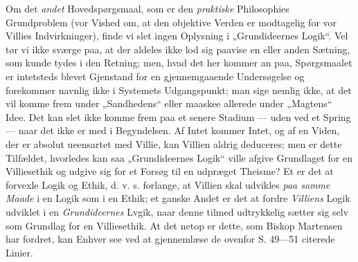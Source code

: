 \documentclass[12pt,a4paper]{book}
\newcommand{\opage}[1]{\marginnote{\footnotesize\textit{[#1]}}}
\begin{document}
Om det \emph{andet} Hovedspørgsmaal, som er den
\emph{praktiske} Philosophies Grundproblem (vor Vished om,
at den objektive Verden er modtagelig for vor Villies
Indvirkninger), finde vi slet ingen Oplysning i „Grundideernes
Logik“. Vel tør vi ikke sværge paa, at der
aldeles ikke lod sig paavise en eller anden Sætning, som
kunde tydes i den Retning; men, hvad det her kommer
an paa, Spørgsmaalet er intetsteds blevet Gjenstand for
en gjennemgaaende Undersøgelse og forekommer navnlig
ikke i Systemets Udgangspunkt; man sige nemlig ikke,
at det vil komme frem under „Sandhedens“ eller maaskee
allerede under „Magtens“ Idee. Det kan slet ikke
komme frem paa et senere Stadium --- uden ved et
Spring --- naar det ikke er med i Begyndelsen. Af
Intet kommer Intet, og af en Viden, der er absolut
ueensartet med Villie, kan Villien aldrig deduceres; men
er dette Tilfældet, hvorledes kan saa „Grundideernes
Logik“ ville afgive Grundlaget for en Villiesethik og
udgive sig for et Forsøg til en udpræget Theisme? Et
er det at forvexle Logik og Ethik, d. v. s. forlange, at
Villien skal udvikles \emph{paa samme Maade} i en Logik
som i en Ethik; et ganske Andet er det at fordre \emph{Villiens}
Logik udviklet i en \emph{Grundideernes}
Lvgik,
naar denne tilmed udtrykkelig sætter sig selv som Grundlag
\opage{53}\setcounter{footnote}{0}%
for en Villiesethik. At det netop er dette, som Biskop
Martensen har fordret, kan Enhver see ved at gjennemlæse
de ovenfor S. 49---51 citerede Linier.
\end{document}
